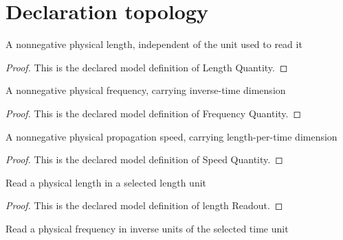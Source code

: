 \section{Declaration topology}
\begin{definition}
  \label{def:physics:phyx-mini-0185:phyxminiproblems-problemphyxmini0185-lengthquantity}
  A nonnegative physical length, independent of the unit used to read it
\end{definition}
\begin{proof}
  This is the declared model definition of Length Quantity.
\end{proof}
\begin{definition}
  \label{def:physics:phyx-mini-0185:phyxminiproblems-problemphyxmini0185-frequencyquantity}
  A nonnegative physical frequency, carrying inverse-time dimension
\end{definition}
\begin{proof}
  This is the declared model definition of Frequency Quantity.
\end{proof}
\begin{definition}
  \label{def:physics:phyx-mini-0185:phyxminiproblems-problemphyxmini0185-speedquantity}
  A nonnegative physical propagation speed, carrying length-per-time dimension
\end{definition}
\begin{proof}
  This is the declared model definition of Speed Quantity.
\end{proof}
\begin{definition}
  \label{def:physics:phyx-mini-0185:phyxminiproblems-problemphyxmini0185-lengthreadout}
  Read a physical length in a selected length unit
\end{definition}
\begin{proof}
  This is the declared model definition of length Readout.
\end{proof}
\begin{definition}
  \label{def:physics:phyx-mini-0185:phyxminiproblems-problemphyxmini0185-frequencyreadout}
  Read a physical frequency in inverse units of the selected time unit
\end{definition}
